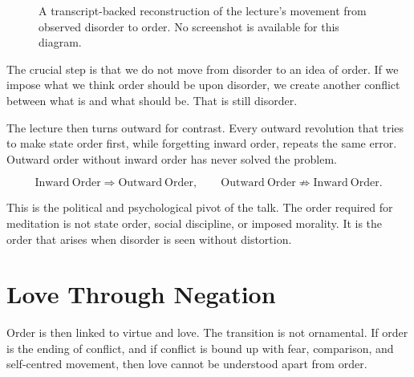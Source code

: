 \begin{figure}
\centering
{}
\caption{A transcript-backed reconstruction of the lecture's movement from observed disorder to order. No screenshot is available for this diagram.}
\end{figure}

The crucial step is that we do not move from disorder to an idea of order. If we impose what we think order should be upon disorder, we create another conflict between what is and what should be. That is still disorder.

The lecture then turns outward for contrast. Every outward revolution that tries to make state order first, while forgetting inward order, repeats the same error. Outward order without inward order has never solved the problem.

\begin{equation}
\mathrm{Inward\ Order} \Rightarrow \mathrm{Outward\ Order},
\qquad
\mathrm{Outward\ Order} \not\Rightarrow \mathrm{Inward\ Order}.
\end{equation}

This is the political and psychological pivot of the talk. The order required for meditation is not state order, social discipline, or imposed morality. It is the order that arises when disorder is seen without distortion.

\section{Love Through Negation}

Order is then linked to virtue and love. The transition is not ornamental. If order is the ending of conflict, and if conflict is bound up with fear, comparison, and self-centred movement, then love cannot be understood apart from order.

